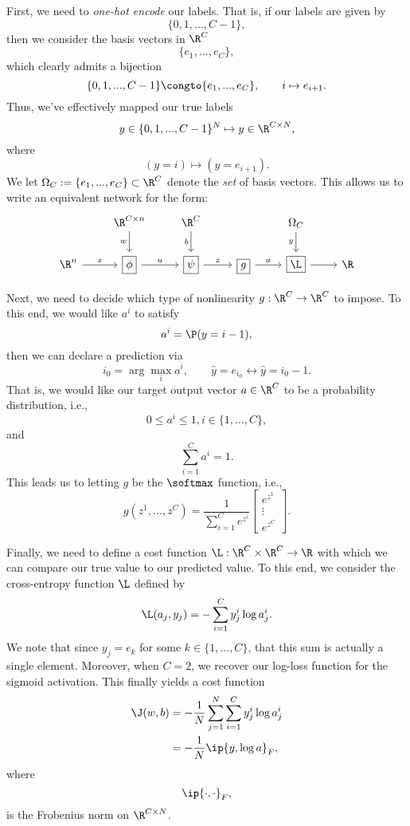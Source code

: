 First, we need to \textit{one-hot encode} our labels.  That is, if our labels are given by
$$\{0,1,...,C-1\},$$
then we consider the basis vectors in $\R^C$
$$\{e_1,...,e_C\},$$
which clearly admits a bijection
$$\{0,1,...,C-1\}\congto\{e_1,...,e_C\},\qquad i\mapsto e_{i+1}.$$
Thus, we've effectively mapped our true labels
$$y\in\{0,1,...,C-1\}^N\mapsto y\in\R^{C\times N},$$
where
$$(y=i)\mapsto (y=e_{i+1}).$$
We let $\Omega_C:=\{e_1,...,e_C\}\subset\R^C$ denote the \textit{set} of basis vectors.  This allows us to write an equivalent network for the form:
\begin{equation*}
	\begin{tikzcd}
		{}
		&\R^{C\times n}
		\arrow[d, swap, "w"]
		&\R^C
		\arrow[d, swap, "b"]
		&{}
		&\Omega_C
		\arrow[d, swap, "y"]
		&{}
		\\
		\R^n
		\arrow[r, "x"]
		&\boxed{\phi}
		\arrow[r, "u"]
		&\boxed{\psi}
		\arrow[r, "z"]
		&\boxed{g}
		\arrow[r, "a"]
		&\boxed{\L}
		\arrow[r]
		&\R
	\end{tikzcd}
\end{equation*}

Next, we need to decide which type of nonlinearity $g:\R^C\to\R^C$ to impose.  To this end, we would like $a^i$ to satisfy
$$a^i=\P(y=i-1),$$
then we can declare a prediction via
$$i_0=\arg\max_ia^i,\qquad \hat{y}=e_{i_0}\leftrightarrow\hat{y}=i_0-1.$$
That is, we would like our target output vector $a\in\R^C$ to be a probability distribution, i.e.,
$$0\leq a^i\leq 1,i\in\{1,...,C\},$$
and
$$\sum_{i=1}^Ca^i=1.$$
This leads us to letting $g$ be the $\softmax$ function, i.e.,
$$g(z^1,...,z^C)=\frac{1}{\sum_{i=1}^Ce^{z^i}}\begin{bmatrix}
	e^{z^1}\\
	\vdots\\
	e^{z^C}
\end{bmatrix}.$$

Finally, we need to define a cost function $\L:\R^C\times\R^C\to\R$ with which we can compare our true value to our predicted value.  To this end, we consider the cross-entropy function $\L$ defined by
$$\L(a_j,y_j)=-\sum_{i=1}^Cy^i_j\log{a^i_j}.$$
We note that since $y_j=e_k$ for some $k\in\{1,...,C\}$, that this sum is actually a single element.  Moreover, when $C=2$, we recover our log-loss function for the sigmoid activation.  This finally yields a cost function
\begin{align*}
	\J(w,b)&=-\frac{1}{N}\sum_{j=1}^N\sum_{i=1}^Cy^i_j\log{a^i_j}\\
	&=-\frac{1}{N}\ip{y,\log{a}}_F,
\end{align*}
where
$$\ip{\cdot,\cdot}_F,$$
is the Frobenius norm on $\R^{C\times N}$.

